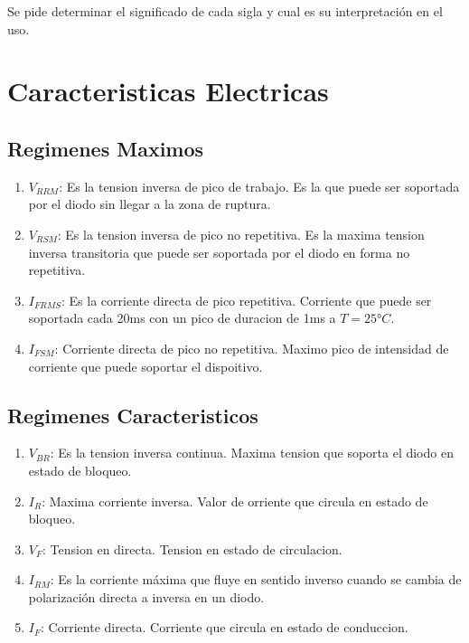 \documentclass[chaptersright]{informeutn}
\begin{document}
        Se pide  determinar el significado de cada sigla y cual es su interpretación en el uso.

        \section{Caracteristicas Electricas}

        \subsection{Regimenes Maximos}
        \begin{enumerate}
          \item $V_{RRM}$: Es la tension inversa de pico de trabajo. Es la que puede ser soportada por el diodo sin
              llegar a la zona de ruptura.\\
            \item $V_{RSM}$: Es la tension inversa de pico no repetitiva. Es la maxima tension inversa transitoria que
              puede ser soportada  por el diodo en forma no repetitiva.\\
            \item $I_{FRMS}$: Es la corriente directa de pico repetitiva. Corriente que puede ser soportada cada 20ms
              con un pico de duracion de 1ms a $T=25°C$.\\
            \item $I_{FSM}$: Corriente directa de pico no repetitiva. Maximo pico de intensidad de corriente que puede
              soportar el dispoitivo.
        \end{enumerate}

        \subsection{Regimenes Caracteristicos}
        \begin{enumerate}
          \item $V_{BR}$: Es la tension inversa continua. Maxima tension que soporta el diodo en estado de bloqueo.\\
            \item $I_R$: Maxima corriente inversa. Valor de orriente que circula en estado de bloqueo.\\
            \item $V_F$: Tension en directa. Tension en estado de circulacion.\\
            \item $I_{RM}$: Es la corriente máxima que fluye en sentido inverso cuando se cambia de polarización
              directa a inversa en un diodo.\\
            \item $I_F$: Corriente directa. Corriente que circula en estado de conduccion.
        \end{enumerate}
\end{document}

